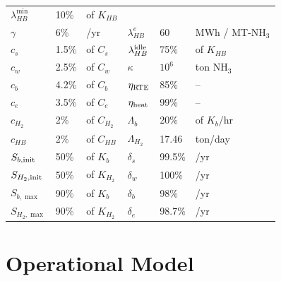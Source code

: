 \documentclass[11pt, letter]{article}
\begin{document}
\begin{table}[htbp]
\begin{tabular}{lll|lll}
$\lambda_{HB}^{\min}$ & 10\% & of $K_{HB}$ \\

$\gamma$ & 6\% & /yr 
&$\lambda_{HB}^{e}$ & 60 & MWh / MT-NH$_3$ \\

$c_s$ & 1.5\% & of $C_s$ &
$\lambda_{HB}^{\rm idle}$ & 75\% & of $K_{HB}$ \\

$c_w$ & 2.5\% & of $C_w$ &
$\kappa$ & $10^6$ & ton NH$_3$ \\

$c_b$ & 4.2\% & of $C_b$ &
$\eta_{\rm RTE}$ & 85\% & -- \\

$c_e$ & 3.5\% & of $C_e$ &
$\eta_{\rm heat}$ & 99\% & -- \\

$c_{H_2}$ & 2\% & of $C_{H_2}$ &
$\Lambda_b$ & 20\% & of $K_b$/hr \\

$c_{HB}$ & 2\% & of $C_{HB}$ &
$\Lambda_{H_2}$ & 17.46 & ton/day \\

$S_{b,\rm init}$ & 50\% & of $K_b$ &
$\delta_s$ & 99.5\% & /yr \\

$S_{H_2,\rm init}$ & 50\% & of $K_{H_2}$ &
$\delta_w$ & 100\% & /yr \\

$S_{b,\max}$ & 90\% & of $K_b$ &
$\delta_b$ & 98\% & /yr \\

$S_{H_2,\max}$ & 90\% & of $K_{H_2}$ &
$\delta_e$ & 98.7\% & /yr \\


\bottomrule
\end{tabular}
\end{table}


\section{Operational Model}
\end{document}
